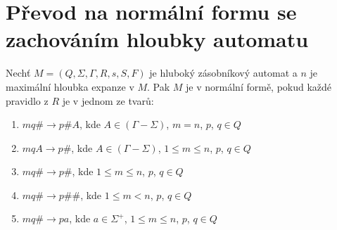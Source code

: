 \section{Převod na normální formu se zachováním hloubky automatu}


\begin{Def}
Nechť $M = (Q,\Sigma,\Gamma, R, s, S , F)$ je hluboký zásobníkový automat
a $n$ je maximální hloubka expanze v $M$.
Pak $M$ je v normální formě, pokud každé pravidlo z $R$ je v jednom ze tvarů:

\begin{enumerate}
\renewcommand{\labelenumi}{(\roman{enumi})}
\item $mq\# \rightarrow p\#A$, kde $A \in (\Gamma - \Sigma)$, $m = n$, $p$, $q \in Q$
\item $mqA \rightarrow p\#$, kde $A \in (\Gamma - \Sigma)$, $1 \le m \le n$, $p$, $q \in Q$
\item $mq\# \rightarrow p\#$, kde $1 \le m \le n$, $p$, $q \in Q$
\item $mq\# \rightarrow p\#\#$, kde $1 \le m < n$, $p$, $q \in Q$
\item $mq\# \rightarrow pa$, kde $a \in {\Sigma}^+$, $1 \le m \le n$, $p$, $q \in Q$

\end{enumerate}

\end{Def}



